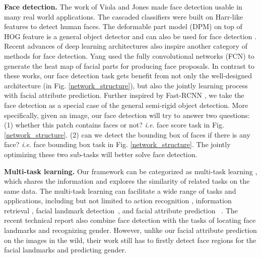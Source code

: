 \documentclass[10pt,twocolumn,letterpaper]{article}
\begin{document}
\vspace{0.05in}

\noindent \textbf{Face detection.} The work of Viola and Jones \cite{viola2001rapid,viola2005multiple}
made face detection usable in many real world applications. The cascaded
classifiers were built on Harr-like features to detect human faces.
The deformable part model (DPM) \cite{felzenszwalb2010object} on
top of HOG feature is a general object detector and can also be used
for face detection \cite{dalal2005histograms}. Recent advances of
deep learning architectures also inspire another category of methods
for face detection. Yang \cite{yang_face} used the fully convolutional
networks (FCN) to generate the heat map of facial parts for producing
face proposals. In contrast to these works, our face detection task
gets benefit from not only the well-designed architecture (in Fig.
\ref{network_structure}), but also the jointly learning process with
facial attribute prediction. Further inspired by Fast-RCNN \cite{fast_rcnn,faster_rcnn},
we take the face detection as a special case of the general semi-rigid
object detection. More specifically, given an image, our face detection
will try to answer two questions: (1) whether this patch contains
faces or not? \emph{i.e}. face score task in Fig. \ref{network_structure}.
(2) can we detect the bounding box of faces if there is any face?
\emph{i.e}. face bounding box task in Fig. \ref{network_structure}.
The jointly optimizing these two sub-tasks will better solve face
detection.

\vspace{0.05in}

\noindent \textbf{Multi-task learning.} Our framework can be categorized
as multi-task learning \cite{yosinski2014transferable,pan2010survey},
which shares the information and explores the similarity of related
tasks on the same data. The multi-task learning can facilitate a wide
range of tasks and applications, including but not limited to action
recognition \cite{zhou2013learning}, information retrieval \cite{liu2015representation},
facial landmark detection~\cite{zhang2014facial,ranjan2016hyperface},
and facial attribute prediction ~\cite{moon_attrb,ehrlich2016facial,abdulnabi2015multi,all_in_one,lu2016fully}.
The recent technical report \cite{ranjan2016hyperface} also combine
face detection with the tasks of locating face landmarks and recognizing
gender. However, unlike our facial attribute prediction on the images
in the wild, their work still has to firstly detect face regions for
the facial landmarks and predicting gender. 
\end{document}
